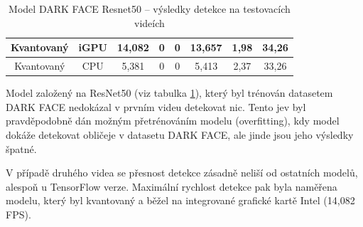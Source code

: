 \begin{table}[H]
\begin{tabular}{cc|ccc|ccc|}
  \multicolumn{1}{|c|}{\cellcolor[HTML]{E0DBDB}Kvantovaný}     & \cellcolor[HTML]{E0DBDB}iGPU & \multicolumn{1}{c|}{14,082}                                 & \multicolumn{1}{c|}{0}                                      & 0              & \multicolumn{1}{c|}{13,657}                                 & \multicolumn{1}{c|}{1,98}                                   & 34,26          \\ \hline
  \multicolumn{1}{|c|}{\cellcolor[HTML]{E0DBDB}Kvantovaný}     & \cellcolor[HTML]{E0DBDB}CPU  & \multicolumn{1}{c|}{5,381}                                  & \multicolumn{1}{c|}{0}                                      & 0              & \multicolumn{1}{c|}{5,413}                                  & \multicolumn{1}{c|}{2,37}                                   & 33,26          \\ \hline
  \end{tabular}
  \label{tabulka:dfrvidea}
  \caption{Model DARK FACE Resnet50 -- výsledky detekce na testovacích videích}
\end{table}

Model založený na ResNet50 (viz tabulka \ref{tabulka:dfrvidea}), který byl trénován datasetem DARK FACE nedokázal v prvním videu detekovat nic. Tento jev byl pravděpodobně dán možným přetrénováním modelu (overfitting), kdy model dokáže detekovat obličeje v datasetu DARK FACE, ale jinde jsou jeho výsledky špatné. 

V případě druhého videa se přesnost detekce zásadně neliší od ostatních modelů, alespoň u TensorFlow verze. Maximální rychlost detekce pak byla naměřena modelu, který byl kvantovaný a běžel na integrované grafické kartě Intel (14,082 FPS).



